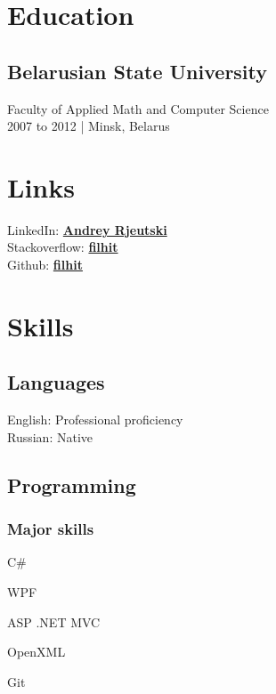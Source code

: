 \documentclass[a4paper,11pt]{article}
\newcommand{\periodandlocation}[1]{{\small #1}}
\newcommand{\minsk}{Minsk, Belarus}
\begin{document}
  \vspace{1cm}
  \begin{minipage}[t]{0.34\textwidth}
    \section*{Education} 
    \subsection*{Belarusian State University}
    Faculty of Applied Math and Computer Science\\
	\periodandlocation{2007 to 2012 | \minsk}
    \section*{Links} 
    LinkedIn: \href{https://linkedin.com/in/andrey-rjeutski-92064741}{\bf Andrey Rjeutski} \\
    Stackoverflow: \href{https://stackoverflow.com/users/3506292/filhit}{\bf filhit}\\
	Github: \href{https://github.com/filhit}{\bf filhit}
    \section*{Skills}
	\subsection*{Languages}
    English: Professional proficiency\\
    Russian: Native
    \subsection*{Programming}
    \subsubsection*{Major skills}
	\begin{inparaitem}
      \item C\# 
	  \item WPF
	  \item ASP .NET MVC
	  \item OpenXML
	  \item Git
	\end{inparaitem}

\end{minipage}
\end{document}

